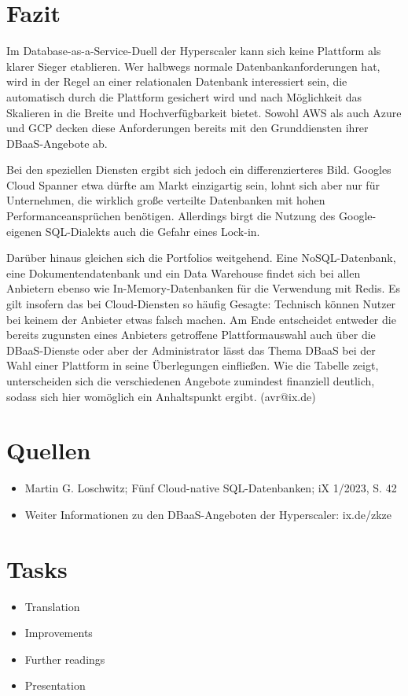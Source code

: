 \section{Fazit}

Im Database-as-a-Service-Duell der Hyperscaler kann sich keine Plattform als klarer Sieger etablieren. Wer halbwegs normale Datenbankanforderungen hat, wird in der Regel an einer relationalen Datenbank interessiert sein, die automatisch durch die Plattform gesichert wird und nach Möglichkeit das Skalieren in die Breite und Hochverfügbarkeit bietet. Sowohl AWS als auch Azure und GCP decken diese Anforderungen bereits mit den Grunddiensten ihrer DBaaS-Angebote ab.

Bei den speziellen Diensten ergibt sich jedoch ein differenzierteres Bild. Googles Cloud Spanner etwa dürfte am Markt einzigartig sein, lohnt sich aber nur für Unternehmen, die wirklich große verteilte Datenbanken mit hohen Performanceansprüchen benötigen. Allerdings birgt die Nutzung des Google-eigenen SQL-Dialekts auch die Gefahr eines Lock-in.

Darüber hinaus gleichen sich die Portfolios weitgehend. Eine NoSQL-Datenbank, eine Dokumentendatenbank und ein Data Warehouse findet sich bei allen Anbietern ebenso wie In-Memory-Datenbanken für die Verwendung mit Redis. Es gilt insofern das bei Cloud-Diensten so häufig Gesagte: Technisch können Nutzer bei keinem der Anbieter etwas falsch machen. Am Ende entscheidet entweder die bereits zugunsten eines Anbieters getroffene Plattformauswahl auch über die DBaaS-Dienste oder aber der Administrator lässt das Thema DBaaS bei der Wahl einer Plattform in seine Überlegungen einfließen. Wie die Tabelle zeigt, unterscheiden sich die verschiedenen Angebote zumindest finanziell deutlich, sodass sich hier womöglich ein Anhaltspunkt ergibt. (avr@ix.de)

\section{Quellen}

\begin{itemize}
  \item Martin G. Loschwitz; Fünf Cloud-native SQL-Datenbanken; iX 1/2023, S. 42
  \item Weiter Informationen zu den DBaaS-Angeboten der Hyperscaler: ix.de/zkze
\end{itemize}

\section{Tasks}


\begin{itemize}
	\item Translation
	\item Improvements
	\item Further readings
	\item Presentation
\end{itemize}
